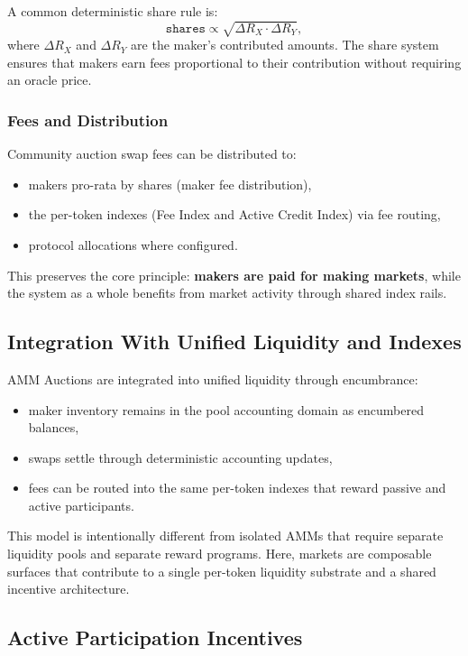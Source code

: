 \documentclass[version=preprint]{iacrcc}
\begin{document}
A common deterministic share rule is:
\[
\texttt{shares} \propto \sqrt{\Delta R_X \cdot \Delta R_Y},
\]
where $\Delta R_X$ and $\Delta R_Y$ are the maker’s contributed amounts. The share system ensures that makers earn fees proportional to their contribution without requiring an oracle price.

\subsubsection{Fees and Distribution}

Community auction swap fees can be distributed to:
\begin{itemize}
  \item makers pro-rata by shares (maker fee distribution),
  \item the per-token indexes (Fee Index and Active Credit Index) via fee routing,
  \item protocol allocations where configured.
\end{itemize}

This preserves the core principle: \textbf{makers are paid for making markets}, while the system as a whole benefits from market activity through shared index rails.

\subsection{Integration With Unified Liquidity and Indexes}

AMM Auctions are integrated into unified liquidity through encumbrance:
\begin{itemize}
  \item maker inventory remains in the pool accounting domain as encumbered balances,
  \item swaps settle through deterministic accounting updates,
  \item fees can be routed into the same per-token indexes that reward passive and active participants.
\end{itemize}

This model is intentionally different from isolated AMMs that require separate liquidity pools and separate reward programs. Here, markets are composable surfaces that contribute to a single per-token liquidity substrate and a shared incentive architecture.

\subsection{Active Participation Incentives}
\end{document}
